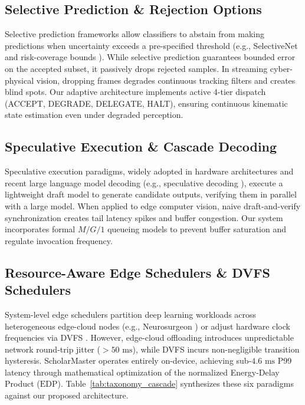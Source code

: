 \documentclass[conference]{IEEEtran}
\begin{document}
\subsection{Selective Prediction \& Rejection Options}
Selective prediction frameworks allow classifiers to abstain from making predictions when uncertainty exceeds a pre-specified threshold (e.g., SelectiveNet \cite{geifman2019selectivenet} and risk-coverage bounds \cite{bartlett2006convexity}). While selective prediction guarantees bounded error on the accepted subset, it passively drops rejected samples. In streaming cyber-physical vision, dropping frames degrades continuous tracking filters and creates blind spots. Our adaptive architecture implements active 4-tier dispatch (ACCEPT, DEGRADE, DELEGATE, HALT), ensuring continuous kinematic state estimation even under degraded perception.

\subsection{Speculative Execution \& Cascade Decoding}
Speculative execution paradigms, widely adopted in hardware architectures and recent large language model decoding (e.g., speculative decoding \cite{leviathan2023fast}), execute a lightweight draft model to generate candidate outputs, verifying them in parallel with a large model. When applied to edge computer vision, naive draft-and-verify synchronization creates tail latency spikes and buffer congestion. Our system incorporates formal $M/G/1$ queueing models to prevent buffer saturation and regulate invocation frequency.

\subsection{Resource-Aware Edge Schedulers \& DVFS Schedulers}
System-level edge schedulers partition deep learning workloads across heterogeneous edge-cloud nodes (e.g., Neurosurgeon \cite{kang2017neurosurgeon}) or adjust hardware clock frequencies via DVFS \cite{satyanarayanan2017emergence, canziani2016analysis}. However, edge-cloud offloading introduces unpredictable network round-trip jitter ($>50\text{ ms}$), while DVFS incurs non-negligible transition hysteresis. ScholarMaster operates entirely on-device, achieving sub-$4.6\text{ ms}$ P99 latency through mathematical optimization of the normalized Energy-Delay Product ($\mathrm{EDP}$). Table~\ref{tab:taxonomy_cascade} synthesizes these six paradigms against our proposed architecture.
\end{document}
